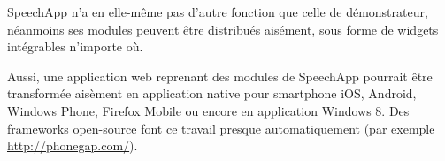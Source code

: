 \documentclass[a4paper,12pt]{report}
\begin{document}
\bigskip{}

SpeechApp n'a en elle-même pas d'autre fonction que celle de démonstrateur, néanmoins ses modules peuvent être distribués aisément, sous forme de widgets intégrables n'importe où.

\medskip{}

Aussi, une application web reprenant des modules de SpeechApp pourrait être transformée aisèment en application native pour smartphone iOS, Android, Windows Phone, Firefox Mobile ou encore en application Windows 8. Des frameworks open-source font ce travail presque automatiquement (par exemple \url{http://phonegap.com/}).
\end{document}
